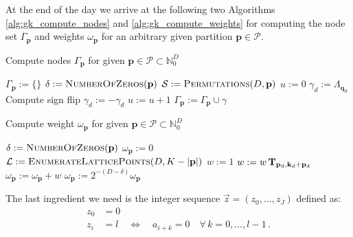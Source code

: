 \documentclass[a4paper,10pt]{article}
\begin{document}
At the end of the day we arrive at the following two Algorithms
\ref{alg:gk_compute_nodes} and \ref{alg:gk_compute_weights}
for computing the node set $\Gamma_\mathbf{p}$ and weights $\omega_\mathbf{p}$
for an arbitrary given partition $\mathbf{p} \in \mathcal{P}$.

\begin{algorithm}[h!]
  \caption{Compute nodes $\Gamma_\mathbf{p}$ for given $\mathbf{p} \in \mathcal{P} \subset \mathbb{N}_0^D$}
  \label{alg:gk_compute_nodes}
  \begin{algorithmic}
      \State $\Gamma_\mathbf{p} := \{\}$
      \State $\delta := \textsc{NumberOfZeros}(\mathbf{p})$
      \State $\mathcal{S} := \textsc{Permutations}(D, \mathbf{p})$
          \State $u := 0$
            \State $\gamma_d := \Lambda_{\mathbf{q}_d}$
              \Comment Compute sign flip
                \State $\gamma_d := - \gamma_d$
              \EndIf
              \State $u := u + 1$
            \EndIf
          \EndFor
          \State $\Gamma_\mathbf{p} := \Gamma_\mathbf{p} \cup \gamma$
        \EndFor
      \EndFor
    \EndProcedure
  \end{algorithmic}
\end{algorithm}

\begin{algorithm}[h!]
  \caption{Compute weight $\omega_\mathbf{p}$ for given $\mathbf{p} \in \mathcal{P} \subset \mathbb{N}_0^D$}
  \label{alg:gk_compute_weights}
  \begin{algorithmic}
      \State $\delta := \textsc{NumberOfZeros}(\mathbf{p})$
      \State $\omega_\mathbf{p} := 0$
      \State $\mathcal{L} := \textsc{EnumerateLatticePoints}(D, K - |\mathbf{p}|)$
        \State $w := 1$
          \State $w := w \, \mathbf{T}_{\mathbf{p}_d, \mathbf{k}_d + \mathbf{p}_d}$
        \EndFor
        \State $\omega_\mathbf{p} := \omega_\mathbf{p} + w$
      \EndFor
      \State $\omega_\mathbf{p} := 2^{-(D-\delta)} \omega_\mathbf{p}$
    \EndProcedure
  \end{algorithmic}
\end{algorithm}

The last ingredient we need is the integer sequence $\vec{z} = (z_0, \ldots, z_J)$ defined as:
\begin{equation}
  \begin{split}
    z_0 & = 0 \\
    z_i & = l \quad \Leftrightarrow \quad a_{i+k} = 0 \quad \forall \, k = 0, \ldots, l-1 \,.
  \end{split}
\end{equation}
\end{document}
